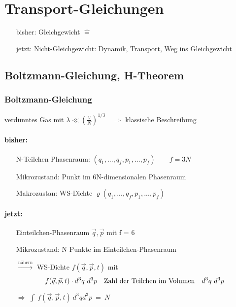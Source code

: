 \section{Transport-Gleichungen} 
\begin{itemize}
    \item[] bisher: Gleichgewicht $\widehat{=}$ 
    \item[] jetzt: Nicht-Gleichgewicht: Dynamik, Transport, Weg ins Gleichgewicht
\end{itemize}

\subsection{Boltzmann-Gleichung, H-Theorem}
\subsubsection*{Boltzmann-Gleichung}
verdünntes Gas mit $\lambda \ll \left(\frac{V}{N}\right)^{1/3} \quad \Rightarrow$ klassische Beschreibung

\paragraph{bisher:}
\begin{itemize}
    \item[] N-Teilchen Phasenraum: $(q_1,...,q_f,p_1,...,p_f) \qquad f= 3N$
    \item[] Mikrozustand: Punkt im 6N-dimensionalen Phasenraum
    \item[] Makrozustan: WS-Dichte $\varrho(q_1,...,q_f,p_1,...,p_f)$
\end{itemize}

\paragraph{jetzt:}
\begin{itemize}
    \item[] Einteilchen-Phasenraum $\Vec{q}, \Vec{p}$ mit f = 6
    \item[] Mikrozustand: N Punkte im Einteilchen-Phasenraum
    \item[] $\stackrel{\text{nähern}}{\longrightarrow}$ WS-Dichte $f(\Vec{q},\Vec{p},t)$ mit
    \begin{equation}
        f(\Vec{q},\Vec{p},t) \cdot d^3q \ d^3p \qq{Zahl der Teilchen im Volumen} d^3q \ d^3p
    \end{equation}
    \item[$\Rightarrow$] $\int \ f(\Vec{q},\Vec{p},t) \ d^3q d^3p \ = \ N$  
\end{itemize}

